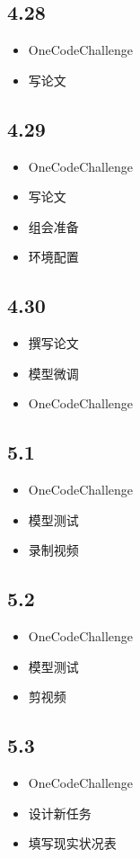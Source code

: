 \documentclass[UTF8]{ctexart}
\begin{document}
\subsection*{4.28}
\begin{itemize}
    \item OneCodeChallenge
    \item 写论文
\end{itemize}

\subsection*{4.29}
\begin{itemize}
    \item OneCodeChallenge
    \item 写论文
    \item 组会准备
    \item 环境配置
\end{itemize}

\subsection*{4.30}
\begin{itemize}
    \item 撰写论文
    \item 模型微调
    \item OneCodeChallenge
\end{itemize}

\subsection*{5.1}
\begin{itemize}
    \item OneCodeChallenge
    \item 模型测试
    \item 录制视频
\end{itemize}

\subsection*{5.2}
\begin{itemize}
    \item OneCodeChallenge
    \item 模型测试
    \item 剪视频
\end{itemize}

\subsection*{5.3}
\begin{itemize}
    \item OneCodeChallenge
    \item 设计新任务
    \item 填写现实状况表
\end{itemize}
\end{document}
